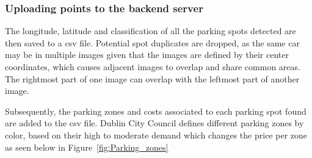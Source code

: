 \newpage

\subsubsection{Uploading points to the backend server}
The longitude, latitude and classification of all the parking spots detected are then saved to a csv file.
Potential spot duplicates are dropped, as the same car may be in multiple images given that the images are defined by their center coordinates, which causes adjacent images to overlap and share common areas. The rightmost part of one image can overlap with the leftmost part of another image.

Subsequently, the parking zones and costs associated to each parking spot found are added to the csv file.
Dublin City Council defines different parking zones by color, based on their high to moderate demand which changes the price per zone as seen below in Figure~\ref{fig:Parking_zones}

